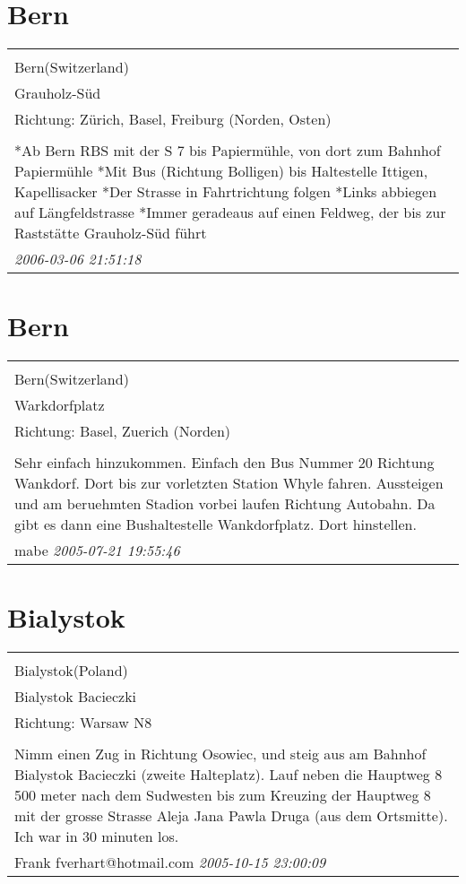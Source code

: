 \documentclass[a4paper,12pt]{article}
\begin{document}
\section{Bern}
\begin{tabular}{|p{13cm}|}
\hline\\
Bern(Switzerland)\\
Grauholz-Süd\\
Richtung: Zürich, Basel, Freiburg (Norden, Osten) \\
\hline\\
*Ab Bern RBS mit der S 7 bis Papiermühle, von dort zum Bahnhof Papiermühle
*Mit Bus (Richtung Bolligen) bis Haltestelle Ittigen, Kapellisacker
*Der Strasse in Fahrtrichtung folgen
*Links abbiegen auf Längfeldstrasse
*Immer geradeaus auf einen Feldweg, der bis zur Raststätte Grauholz-Süd führt \\
\textit{ 2006-03-06 21:51:18 }\\\hline
\end{tabular}


\section{Bern}
\begin{tabular}{|p{13cm}|}
\hline\\
Bern(Switzerland)\\
Warkdorfplatz\\
Richtung: Basel, Zuerich (Norden) \\
\hline\\
Sehr einfach hinzukommen. Einfach den Bus Nummer 20 Richtung Wankdorf. Dort bis zur vorletzten Station Whyle fahren. Aussteigen und am beruehmten Stadion vorbei laufen Richtung Autobahn. Da gibt es dann eine Bushaltestelle Wankdorfplatz. Dort hinstellen. \\
mabe \textit{ 2005-07-21 19:55:46 }\\\hline
\end{tabular}


\section{Bialystok}
\begin{tabular}{|p{13cm}|}
\hline\\
Bialystok(Poland)\\
Bialystok Bacieczki\\
Richtung: Warsaw N8 \\
\hline\\
Nimm einen Zug in Richtung Osowiec, und steig aus am Bahnhof Bialystok Bacieczki (zweite Halteplatz). Lauf neben die Hauptweg 8 500 meter nach dem Sudwesten bis zum Kreuzing der Hauptweg 8 mit der grosse Strasse Aleja Jana Pawla Druga (aus dem Ortsmitte). Ich war in 30 minuten los. \\
Frank fverhart@hotmail.com \textit{ 2005-10-15 23:00:09 }\\\hline
\end{tabular}
\end{document}
